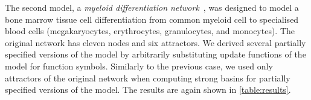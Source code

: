 The second model, a \emph{myeloid differentiation network}~\cite{Krumsiek2011}, was designed to model a bone marrow tissue cell differentiation from common myeloid cell to specialised blood cells (megakaryocytes, erythrocytes, granulocytes, and monocytes). The original network has eleven nodes and six attractors. We derived several partially specified versions of the model by arbitrarily substituting update functions of the model for function symbols. Similarly to the previous case, we used only attractors of the original network when computing strong basins for partially specified versions of the model. 
The results are again shown in \autoref{table:results}.

	
